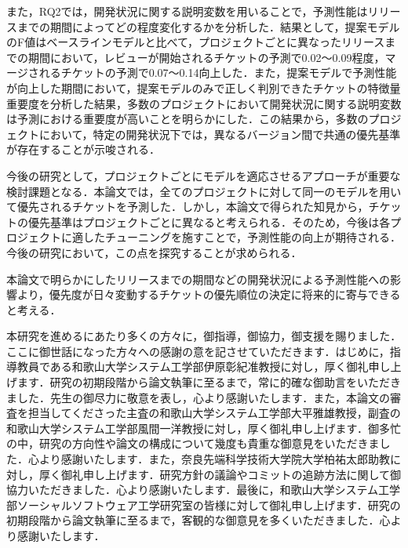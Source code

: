 \documentclass[11pt]{jreport}
\begin{document}
また，RQ2では，開発状況に関する説明変数を用いることで，予測性能はリリースまでの期間によってどの程度変化するかを分析した．結果として，提案モデルのF値はベースラインモデルと比べて，プロジェクトごとに異なったリリースまでの期間において，レビューが開始されるチケットの予測で0.02〜0.09程度，マージされるチケットの予測で0.07〜0.14向上した．また，提案モデルで予測性能が向上した期間において，提案モデルのみで正しく判別できたチケットの特徴量重要度を分析した結果，多数のプロジェクトにおいて開発状況に関する説明変数は予測における重要度が高いことを明らかにした．この結果から，多数のプロジェクトにおいて，特定の開発状況下では，異なるバージョン間で共通の優先基準が存在することが示唆される．

今後の研究として，プロジェクトごとにモデルを適応させるアプローチが重要な検討課題となる．本論文では，全てのプロジェクトに対して同一のモデルを用いて優先されるチケットを予測した．しかし，本論文で得られた知見から，チケットの優先基準はプロジェクトごとに異なると考えられる．そのため，今後は各プロジェクトに適したチューニングを施すことで，予測性能の向上が期待される．今後の研究において，この点を探究することが求められる．

本論文で明らかにしたリリースまでの期間などの開発状況による予測性能への影響より，優先度が日々変動するチケットの優先順位の決定に将来的に寄与できると考える．




\begin{acknowledgements}
本研究を進めるにあたり多くの方々に，御指導，御協力，御支援を賜りました．ここに御世話になった方々への感謝の意を記させていただきます．はじめに，指導教員である和歌山大学システム工学部伊原彰紀准教授に対し，厚く御礼申し上げます．研究の初期段階から論文執筆に至るまで，常に的確な御助言をいただきました．先生の御尽力に敬意を表し，心より感謝いたします．また，本論文の審査を担当してくださった主査の和歌山大学システム工学部大平雅雄教授，副査の和歌山大学システム工学部風間一洋教授に対し，厚く御礼申し上げます．御多忙の中，研究の方向性や論文の構成について幾度も貴重な御意見をいただきました．心より感謝いたします．また，奈良先端科学技術大学院大学柏祐太郎助教に対し，厚く御礼申し上げます．研究方針の議論やコミットの追跡方法に関して御協力いただきました．心より感謝いたします．最後に，和歌山大学システム工学部ソーシャルソフトウェア工学研究室の皆様に対して御礼申し上げます．研究の初期段階から論文執筆に至るまで，客観的な御意見を多くいただきました．心より感謝いたします．
\end{acknowledgements}
\end{document}
